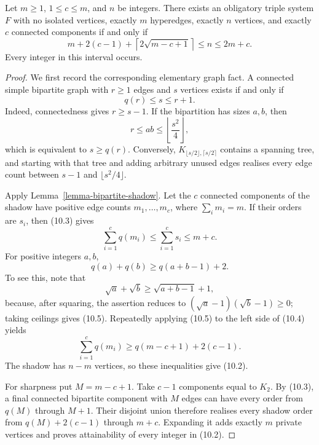 \begin{theorem}
\label{theorem-order-size-component-spectrum}
Let $m\ge1$, $1\le c\le m$, and $n$ be integers.  There exists an obligatory
triple system $F$ with no isolated vertices, exactly $m$ hyperedges, exactly
$n$ vertices, and exactly $c$ connected components if and only if
\[
\boxed{
 m+2(c-1)+\left\lceil2\sqrt{m-c+1}\right\rceil
 \le n\le 2m+c.
}
\tag{10.2}
\]
Every integer in this interval occurs.
\end{theorem}
\begin{proof}
We first record the corresponding elementary graph fact.  A connected simple
bipartite graph with $r\ge1$ edges and $s$ vertices exists if and only if
\[
q(r)\le s\le r+1.
\tag{10.3}
\]
Indeed, connectedness gives $r\ge s-1$.  If the bipartition has sizes $a,b$,
then
\[
r\le ab\le\left\lfloor\frac{s^2}{4}\right\rfloor,
\]
which is equivalent to $s\ge q(r)$.  Conversely,
$K_{\lfloor s/2\rfloor,\lceil s/2\rceil}$ contains a spanning tree, and
starting with that tree and adding arbitrary unused edges realises every edge
count between $s-1$ and $\lfloor s^2/4\rfloor$.

Apply Lemma~\ref{lemma-bipartite-shadow}.  Let the $c$ connected components of
the shadow have positive edge counts $m_1,\ldots,m_c$, where
$\sum_i m_i=m$.  If their orders are $s_i$, then (10.3) gives
\[
\sum_{i=1}^c q(m_i)\le \sum_{i=1}^c s_i\le m+c.
\tag{10.4}
\]
For positive integers $a,b$,
\[
q(a)+q(b)\ge q(a+b-1)+2.
\tag{10.5}
\]
To see this, note that
\[
\sqrt a+\sqrt b\ge\sqrt{a+b-1}+1,
\]
because, after squaring, the assertion reduces to
$(\sqrt a-1)(\sqrt b-1)\ge0$; taking ceilings gives (10.5).  Repeatedly
applying (10.5) to the left side of (10.4) yields
\[
\sum_{i=1}^c q(m_i)
\ge q(m-c+1)+2(c-1).
\]
The shadow has $n-m$ vertices, so these inequalities give (10.2).

For sharpness put $M=m-c+1$.  Take $c-1$ components equal to $K_2$.  By
(10.3), a final connected bipartite component with $M$ edges can have every
order from $q(M)$ through $M+1$.  Their disjoint union therefore realises
every shadow order from $q(M)+2(c-1)$ through $m+c$.  Expanding it adds
exactly $m$ private vertices and proves attainability of every integer in
(10.2).
\end{proof}

